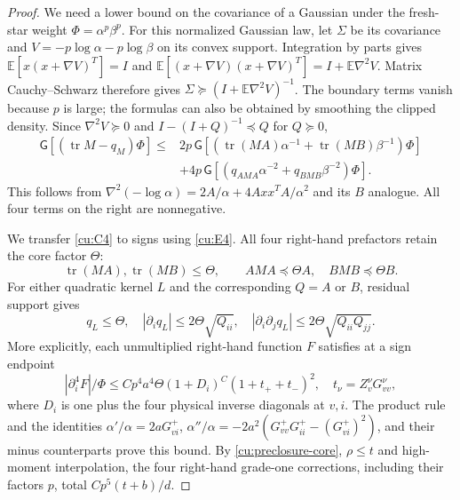 \documentclass[10pt]{article}
\numberwithin{equation}{section}
\newcommand{\1}{\mathbf1}
\begin{document}
\begin{proof}
We need a lower bound on the covariance of a Gaussian under the
fresh-star weight $\Phi=\alpha^p\beta^p$. For this normalized Gaussian
law, let $\Sigma$ be its covariance and
$V=-p\log\alpha-p\log\beta$ on its convex support.
Integration by parts gives
$\mathbb E[x(x+\nabla V)^T]=I$ and
$\mathbb E[(x+\nabla V)(x+\nabla V)^T]=I+\mathbb E\nabla^2V$.
Matrix Cauchy--Schwarz therefore gives
$\Sigma\succeq(I+\mathbb E\nabla^2V)^{-1}$.
The boundary terms vanish because $p$ is large; the formulas can
also be obtained by smoothing the clipped density.
Since $\nabla^2V\succeq0$ and $I-(I+Q)^{-1}\preceq Q$ for $Q\succeq0$,
\[
 \begin{split}
 \mathsf G[(\operatorname{tr}M-q_M)\Phi]
 \le{}&2p\,\mathsf G[(\operatorname{tr}(MA)\alpha^{-1}
                         +\operatorname{tr}(MB)\beta^{-1})\Phi]\\
 &+4p\,\mathsf G[(q_{AMA}\alpha^{-2}
                         +q_{BMB}\beta^{-2})\Phi].
 \end{split}\tag{C4}\label{cu:C4}
\]
This follows from
$\nabla^2(-\log\alpha)=2A/\alpha+4Axx^TA/\alpha^2$ and its
$B$ analogue. All four terms on the right are nonnegative.

We transfer \eqref{cu:C4} to signs using \eqref{cu:E4}.
All four right-hand prefactors retain the core factor $\Theta$:
\[
 \operatorname{tr}(MA),\operatorname{tr}(MB)\le\Theta,
 \qquad AMA\preceq\Theta A,\quad BMB\preceq\Theta B.
\]
For either quadratic kernel $L$ and the corresponding $Q=A$ or $B$,
residual support gives
\[
 q_L\le\Theta,\quad |\partial_iq_L|\le2\Theta\sqrt{Q_{ii}},
 \quad |\partial_i\partial_jq_L|\le2\Theta\sqrt{Q_{ii}Q_{jj}}.
\]
More explicitly, each unmultiplied right-hand function $F$ satisfies
at a sign endpoint
\[
 |\partial_i^4F|/\Phi
 \le Cp^4a^4\Theta(1+D_i)^C(1+t_++t_-)^2,
 \quad t_\nu=Z_v^\nu G^\nu_{vv},
\]
where $D_i$ is one plus the four physical inverse diagonals at $v,i$.
The product rule and the identities
$\alpha'/\alpha=2aG^+_{vi}$,
$\alpha''/\alpha=-2a^2(G^+_{vv}G^+_{ii}-(G^+_{vi})^2)$,
and their minus counterparts prove this bound.
By \eqref{cu:preclosure-core}, $\rho\le t$ and high-moment
interpolation, the four right-hand grade-one corrections, including
their factors $p$, total $Cp^5(t+b)/d$.


\end{proof}
\end{document}
